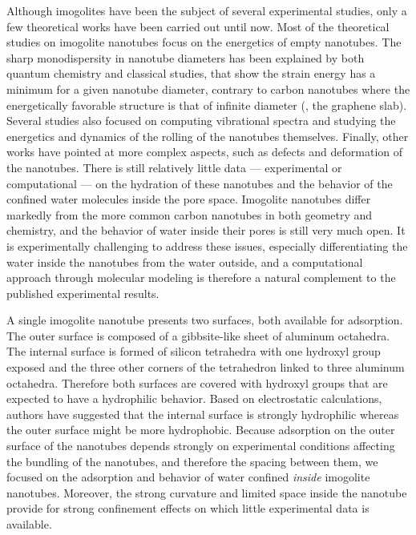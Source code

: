 \documentclass[thesis]{subfiles}
\begin{document}
Although imogolites have been the subject of several experimental studies, only
a few theoretical works have been carried out until now. Most of the theoretical
studies on imogolite nanotubes focus on the energetics of empty nanotubes. The
sharp monodispersity in nanotube diameters has been explained by both quantum
chemistry and classical studies, that show the strain energy has a minimum for a
given nanotube diameter, contrary to carbon nanotubes where the energetically
favorable structure is that of infinite diameter (\ie, the graphene
slab\cite{Tamura2002, Guimaraes2007, Zhao2009, Demichelis2010}). Several studies
also focused on computing vibrational spectra\cite{Tamura2002,
AlvarezRamirez2007, Konduri2008} and studying the energetics and dynamics of the
rolling of the nanotubes themselves\cite{Lee2011, Gonzalez2014, Gonzalez2016}.
Finally, other works have pointed at more complex aspects, such as
defects\cite{Gustafsson2001} and deformation of the nanotubes\cite{Tamura2002,
Amara2014, Creton2008}. There is still relatively little data --- experimental
or computational --- on the hydration of these nanotubes and the behavior of the
confined water molecules inside the pore space. Imogolite nanotubes differ
markedly from the more common carbon nanotubes in both geometry and chemistry,
and the behavior of water inside their pores is still very much open. It is
experimentally challenging to address these issues, especially differentiating
the water inside the nanotubes from the water outside, and a computational
approach through molecular modeling is therefore a natural complement to the
published experimental results.

A single imogolite nanotube presents two surfaces, both available for
adsorption. The outer surface is composed of a gibbsite-like sheet of aluminum
octahedra. The internal surface is formed of silicon tetrahedra with one hydroxyl
group exposed and the three other corners of the tetrahedron linked to three
aluminum octahedra. Therefore both surfaces are covered with hydroxyl groups
that are expected to have a hydrophilic behavior. Based on electrostatic
calculations, authors have suggested that the internal surface is strongly
hydrophilic whereas the outer surface might be more
hydrophobic\cite{Gustafsson2001,Guimaraes2007}. Because adsorption on the outer
surface of the nanotubes depends strongly on experimental conditions affecting
the bundling of the nanotubes, and therefore the spacing between them, we
focused on the adsorption and behavior of water confined \emph{inside} imogolite
nanotubes. Moreover, the strong curvature and limited space inside the nanotube
provide for strong confinement effects on which little experimental data is
available.
\end{document}
